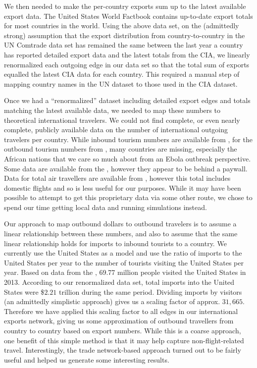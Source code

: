 \documentclass[10pt, journal,onecolumn]{IEEEtran}
\begin{document}
We then needed to make the per-country exports sum up to the latest available export data.
The United States \citep{ciatotalexports} World Factbook contains up-to-date export totals
for most countries in the world. Using the above data set, on the (admittedly strong) assumption
that the export distribution
from country-to-country in the UN Comtrade data set has remained the same between the last year a
country has reported detailed export data and the latest totals from the CIA, we linearly renormalized
each outgoing edge in our data set so that the total sum of exports equalled the latest CIA data
for each country.
This required a manual step of mapping country names in the UN dataset to those used in
the CIA dataset.

Once we had a ``renormalized'' dataset including detailed export edges and totals matching
the latest available data, we needed to map these numbers to theoretical international travelers.
We could not find complete, or even nearly complete, publicly available data on the number of
international outgoing travelers per country. While inbound tourism numbers are available from
\citep{worldbankinboundtourism}, for the outbound tourism numbers from \citep{worldbankoutboundtourism},
many countries are missing,
especially the African nations that we care so much about from an Ebola outbreak perspective.
Some data are available from the \citep{unwtooutboundtourism}, however they appear to be behind a paywall.
Data for total air travellers are available from \citep{worldbankairpassengers},
however this total includes domestic flights and so is less useful for our purposes.
While it may have been possible to attempt to get this proprietary data via some other route,
we chose to spend our time getting local data and running simulations instead.

Our approach to map outbound dollars to outbound travelers is to assume a linear relationship
between these numbers, and also to assume that the same linear relationship holds for imports to
inbound tourists to a country.
We currently use the United States as a model and use the ratio of
imports to the United States per year to the number of tourists visiting the United States per year.
Based on data from the \citep{usinboundtourists}, 69.77 million people visited the United States in 2013.
According to our renormalized data set, total imports into the United States were
\$$2.21$ trillion during the same period. Dividing imports by visitors (an admittedly
simplistic approach) gives us a scaling factor of approx. $31,665$. Therefore we have applied this
scaling factor to all edges in our international exports network, giving us some approximation of
outbound travellers from country to country based on export numbers.
While this is a coarse approach, one benefit of this simple method is that it may help capture non-flight-related
travel. Interestingly, the trade network-based approach turned out to be fairly useful and helped us generate
some interesting results.
\end{document}
